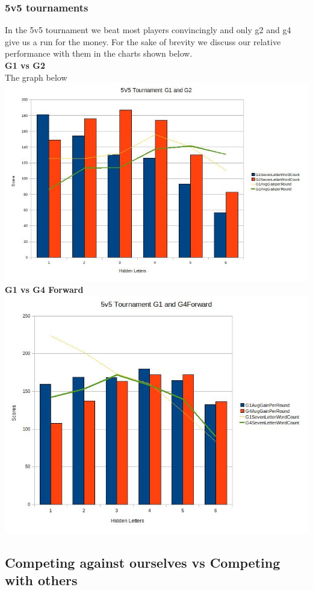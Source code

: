 \documentclass[11pt]{article}
\begin{document}
	\subsubsection{5v5 tournaments}
	In the 5v5 tournament we beat most players convincingly and only g2 and g4 give us a run for the money. For the sake of brevity we discuss our relative performance with them in the charts shown below.\\
	\textbf{G1 vs G2}\\
	The graph below
	\includegraphics[width=1 \textwidth]{5v5option3G1G2}
	\textbf{G1 vs G4 Forward}
	\includegraphics[width=1 \textwidth]{5v5optionG1G4}
	\subsection{Competing against ourselves vs Competing with others}
\end{document}
